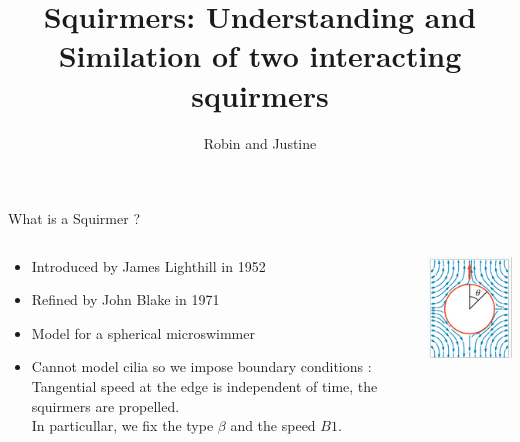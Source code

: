 \documentclass{beamer}
\title{Squirmers: Understanding and Similation of two interacting squirmers}
\author{Robin and Justine}
\begin{document}
\begin{frame}
    \titlepage
\end{frame}

\begin{frame}{What is a Squirmer ?}
    \begin{columns}[T]
        \begin{column}{0.5\textwidth}
            \begin{itemize}
                \item Introduced by James Lighthill in 1952 \cite{Wikipedia}
                \item Refined by John Blake in 1971 \cite{Wikipedia}
                \item Model for a spherical microswimmer
                \item Cannot model cilia so we impose boundary conditions :
                \\Tangential speed at the edge is independent of time, the squirmers are propelled.
                \\In particullar, we fix the type $\beta$ and the speed $B1$.
            \end{itemize}
        \end{column}
        \begin{column}{0.5\textwidth}
            \centering
            \includegraphics[width=\textwidth]{images/squirmer.png}
        \end{column}
    \end{columns}
\end{frame}
\end{document}
